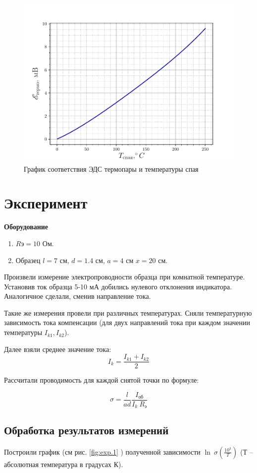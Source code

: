 \begin{figure}[h!]
	\centering
	\includegraphics[width = .9\linewidth]{img/grad.pdf}
	\caption{График соответствия ЭДС термопары и температуры спая}
	\label{fig:6.3}
\end{figure}

\newpage
\section*{Эксперимент}
\textbf{Оборудование}
\begin{enumerate}
	\item $R{\text{э}} = 10$ Ом.
	\item Образец $l = 7$ см, $d=1.4$ см, $a = 4$ см $x = 20$ см.
\end{enumerate}

Произвели измерение электропроводности образца при комнатной температуре. Установив ток образца 5-10 мА
добились нулевого отклонения индикатора. Аналогичное сделали, сменив направление тока.

Такие же измерения провели при различных температурах. Сняли температурную зависимость тока компенсации (для двух направлений тока при каждом
значении температуры $I_{k1},I_{k2}$).

Далее взяли среднее значение тока:
$$I_k=\frac{I_{k1}+I_{k2}}{2}$$

Рассчитали проводимость для каждой снятой точки по формуле:

$$\sigma = \frac{l}{ad} \frac{I_{\text{об}}}{ I_k ~ R_{\text{э}}}$$


\subsection*{Обработка результатов измерений}
Построили график (см рис. \ref{fig:exp.1} ) полученной зависимости $\ln~\sigma(\frac{10^3}{T})$ (Т – абсолютная температура в градусах К).

